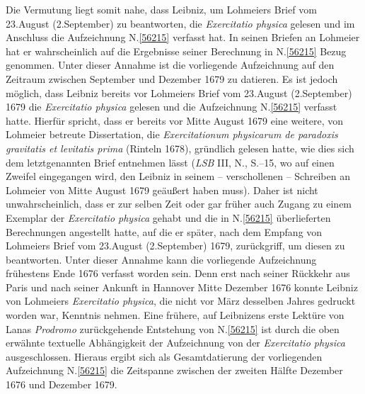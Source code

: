 Die Vermutung liegt somit nahe, dass Leibniz, um Lohmeiers Brief vom 23.\;August (2.\;September) zu beantworten, die \textit{Exercitatio physica}\cite{01422} gelesen und im Anschluss die Aufzeichnung N.\;\ref{56215} verfasst hat.
In seinen Briefen an Lohmeier hat er wahrscheinlich auf die Ergebnisse seiner Berechnung in N.\;\ref{56215} Bezug genommen.
Unter dieser Annahme ist die vorliegende Aufzeichnung auf den Zeitraum zwischen September und Dezember 1679 zu datieren.
\pend%
\pstart%
Es ist jedoch möglich, dass Leibniz bereits vor Lohmeiers Brief vom 23.\;August (2.\;September) 1679 die \textit{Exercitatio physica}\cite{01422} gelesen und die Aufzeichnung N.\;\ref{56215} verfasst hatte.
Hierfür spricht, dass er bereits vor Mitte August 1679 eine weitere, von Lohmeier betreute Dissertation, die \textit{Exercitationum physicarum de paradoxis gravitatis et levitatis prima} (Rinteln 1678),\cite{01429} gründlich gelesen hatte, wie dies sich dem letztgenannten Brief entnehmen lässt (\textit{LSB} III, N., S.--15, wo auf einen Zweifel eingegangen wird, den Leibniz in seinem -- verschollenen -- Schreiben an Lohmeier von Mitte August 1679 %
geäußert haben muss).
Daher ist nicht unwahrscheinlich, dass er zur selben Zeit oder gar früher auch Zugang zu einem Exemplar der \textit{Exercitatio physica}\cite{01422} gehabt und die in N.\;\ref{56215} überlieferten Berechnungen angestellt hatte, auf die er später, nach dem Empfang von Lohmeiers Brief vom 23.\;August (2.\;September) 1679,\cite{01425} zurückgriff, um diesen zu beantworten.
Unter dieser Annahme kann die vorliegende Aufzeichnung frühestens Ende 1676 verfasst worden sein.
Denn erst nach seiner Rückkehr aus Paris und nach seiner Ankunft in Hannover Mitte Dezember 1676 konnte Leibniz von Lohmeiers \textit{Exercitatio physica},\cite{01422} die nicht vor März desselben Jahres gedruckt worden war, Kenntnis nehmen.
Eine frühere, auf Leibnizens erste Lektüre von Lanas \textit{Prodromo}\cite{00069} zurückgehende Entstehung von N.\;\ref{56215} ist durch die oben erwähnte textuelle Abhängigkeit der Aufzeichnung von der \textit{Exercitatio physica}\cite{01422} ausgeschlossen.
Hieraus ergibt sich als Gesamtdatierung der vorliegenden Aufzeichnung N.\;\ref{56215} die Zeitspanne zwischen der zweiten Hälfte Dezember 1676 und Dezember 1679.
\pend%
%
\frenchspacing%
\normalsize%
\newpage%
